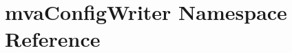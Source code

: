 \hypertarget{namespacemvaConfigWriter}{
\section{mvaConfigWriter Namespace Reference}
\label{namespacemvaConfigWriter}
}

